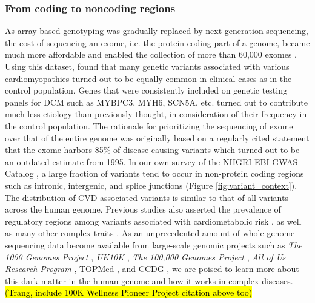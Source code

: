 \documentclass[letter]{bioinfo}
\begin{document}
\subsubsection*{From coding to noncoding regions}	
	As array-based genotyping was gradually replaced by next-generation sequencing, the cost of sequencing an exome, i.e. the protein-coding part of a genome, became much more affordable and enabled the collection of more than 60,000 exomes \citep{Lek:2016:Analysis}. Using this dataset, \cite{Walsh:2017:Reassessment} found that many genetic variants associated with various cardiomyopathies turned out to be equally common in clinical cases as in the control population. Genes that were consistently included on genetic testing panels for DCM such as MYBPC3, MYH6, SCN5A, etc. turned out to contribute much less etiology than previously thought, in consideration of their frequency in the control population.  The rationale for prioritizing the sequencing of exome over that of the entire genome was originally based on a regularly cited statement that the exome harbors 85\% of disease-causing variants \citep{Antonarakis:2001:nature} which turned out to be an outdated estimate from 1995. In our own survey of the NHGRI-EBI GWAS Catalog \citep{MacArthur:2017:new}, a large fraction of variants tend to occur in non-protein coding regions such as intronic, intergenic, and splice junctions (Figure \ref{fig:variant_context}). The distribution of CVD-associated variants is similar to that of all variants across the human genome. Previous studies also asserted the prevalence of regulatory regions among variants associated with cardiometabolic risk \citep{Franzen:2016:Cardiometabolic}, as well as many other complex traits \citep{Pickrell:2014:Joint}. As an unprecedented amount of whole-genome sequencing data become available from large-scale genomic projects such as \textit{The 1000 Genomes Project} \citep{1000G:2015:global}, \textit{UK10K} \citep{TheUK10KConsortium:2015:UK10K}, \textit{The 100,000 Genomes Project} \citep{Caulfield:2017:100K}, \textit{All of Us Research Program} \citep{NIH:2018:All}, TOPMed \citep{NHLBI:2014:TransOmics}, and CCDG \citep{NHGRI:2016:CCDG}, we are poised to learn more about this dark matter in the human genome and how it works in complex diseases. \hl{(Trang, include 100K Wellness Pioneer Project citation above too)}
\end{document}
